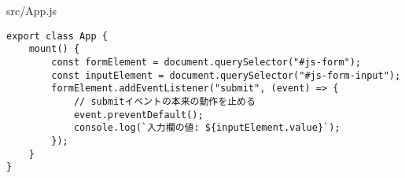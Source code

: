 \begin{listtitle}
src/App.js
\end{listtitle}
\begin{lstlisting}
export class App {
    mount() {
        const formElement = document.querySelector("#js-form");
        const inputElement = document.querySelector("#js-form-input");
        formElement.addEventListener("submit", (event) => {
            // submitイベントの本来の動作を止める
            event.preventDefault();
            console.log(`入力欄の値: ${inputElement.value}`);
        });
    }
}
\end{lstlisting}
\listend
